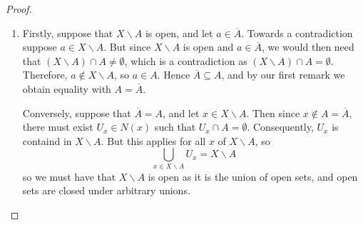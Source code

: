 \documentclass[12pt, a4paper, oneside, openright, titlepage]{book}
\begin{document}
\begin{proof}
\begin{enumerate}
        \item Firstly, suppose that $X\backslash A$ is open, and let $a \in \overline{A}$. Towards a contradiction suppose $a \in X\backslash A$. But since $X\backslash A$ is open and $a \in \overline{A}$, we would then need that $(X\backslash A) \cap A \neq \emptyset$, which is a contradiction as $(X\backslash A)\cap A = \emptyset$. Therefore, $a \notin X\backslash A$, so $a \in A$. Hence $\overline{A} \subseteq A$, and by our first remark we obtain equality with $A = \overline{A}$.

            Conversely, suppose that $\overline{A} = A$, and let $x \in X\backslash A$. Then since $x \notin A = \overline{A}$, there must exist $U_x \in N(x)$ such that $U_x \cap A = \emptyset$. Consequently, $U_x$ is containd in $X\backslash A$. But this applies for all $x$ of $X\backslash A$, so \begin{equation*}
                \bigcup_{x \in X\backslash A}U_x = X\backslash A
            \end{equation*}
            so we must have that $X\backslash A$ is open as it is the union of open sets, and open sets are closed under arbitrary unions.
    \end{enumerate}
\end{proof}
\end{document}
